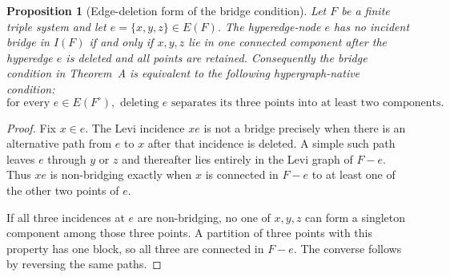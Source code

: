 \documentclass[a4paper,11pt,reqno]{amsart}
\theoremstyle{plain}
\newtheorem{proposition}[theorem]{Proposition}
\theoremstyle{definition}
\theoremstyle{remark}
\begin{document}
\begin{proposition}[Edge-deletion form of the bridge condition]
\label{proposition-edge-deletion-bridge-condition}
Let $F$ be a finite triple system and let $e=\{x,y,z\}\in E(F)$.  The
hyperedge-node $e$ has no incident bridge in $I(F)$ if and only if $x,y,z$
lie in one connected component after the hyperedge $e$ is deleted and all
points are retained.  Consequently the bridge condition in Theorem~A is
equivalent to the following hypergraph-native condition:
\[
\text{for every }e\in E(F^\circ),\text{ deleting }e\text{ separates its
three points into at least two components.}
\]
\end{proposition}
\begin{proof}
Fix $x\in e$.  The Levi incidence $xe$ is not a bridge precisely when there
is an alternative path from $e$ to $x$ after that incidence is deleted.  A
simple such path leaves $e$ through $y$ or $z$ and thereafter lies entirely
in the Levi graph of $F-e$.  Thus $xe$ is non-bridging exactly when $x$ is
connected in $F-e$ to at least one of the other two points of $e$.

If all three incidences at $e$ are non-bridging, no one of $x,y,z$ can form a
singleton component among those three points.  A partition of three points
with this property has one block, so all three are connected in $F-e$.  The
converse follows by reversing the same paths.
\end{proof}
\end{document}
